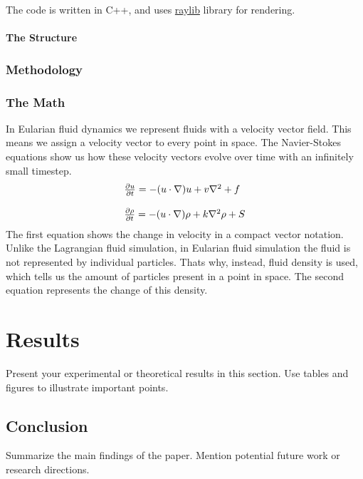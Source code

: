 \documentclass[a4paper,12pt]{article}
\begin{document}
The code is written in C++, and uses \hyperlink{https://www.raylib.com/}{raylib} library for rendering.

\paragraph{The Structure}
\subsubsection{Methodology}

\subsubsection{The Math}
In Eularian fluid dynamics we represent fluids with a velocity vector field. This means we assign a velocity vector to every point in space.
The Navier-Stokes equations show us how these velocity vectors evolve over time with an infinitely small timestep.
\[
\begin{array}{ll}
	\pdv{u}{t} = -(u \cdot \nabla)u + v\nabla^2 + f \\
  \\
  \pdv{\rho}{t} = -(u \cdot \nabla)\rho + k\nabla^2\rho + S
\end{array}
\]
The first equation shows the change in velocity in a compact vector notation. 
Unlike the Lagrangian fluid simulation, in Eularian fluid simulation the fluid is not represented by individual particles. 
Thats why, instead, fluid density is used, which tells us the amount of particles present in a point in space. 
The second equation represents the change of this density.

\section{Results}
Present your experimental or theoretical results in this section. Use tables and figures to illustrate important points.

\subsection{Conclusion}
Summarize the main findings of the paper. Mention potential future work or research directions.

\nocite{*}
\printbibliography
\end{document}
